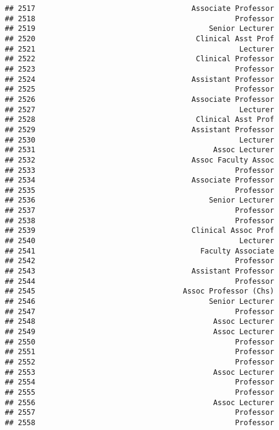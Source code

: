 \documentclass[
]{article}
\begin{document}
\begin{verbatim}
## 2517                                    Associate Professor
## 2518                                              Professor
## 2519                                        Senior Lecturer
## 2520                                     Clinical Asst Prof
## 2521                                               Lecturer
## 2522                                     Clinical Professor
## 2523                                              Professor
## 2524                                    Assistant Professor
## 2525                                              Professor
## 2526                                    Associate Professor
## 2527                                               Lecturer
## 2528                                     Clinical Asst Prof
## 2529                                    Assistant Professor
## 2530                                               Lecturer
## 2531                                         Assoc Lecturer
## 2532                                    Assoc Faculty Assoc
## 2533                                              Professor
## 2534                                    Associate Professor
## 2535                                              Professor
## 2536                                        Senior Lecturer
## 2537                                              Professor
## 2538                                              Professor
## 2539                                    Clinical Assoc Prof
## 2540                                               Lecturer
## 2541                                      Faculty Associate
## 2542                                              Professor
## 2543                                    Assistant Professor
## 2544                                              Professor
## 2545                                  Assoc Professor (Chs)
## 2546                                        Senior Lecturer
## 2547                                              Professor
## 2548                                         Assoc Lecturer
## 2549                                         Assoc Lecturer
## 2550                                              Professor
## 2551                                              Professor
## 2552                                              Professor
## 2553                                         Assoc Lecturer
## 2554                                              Professor
## 2555                                              Professor
## 2556                                         Assoc Lecturer
## 2557                                              Professor
## 2558                                              Professor

\end{verbatim}
\end{document}
